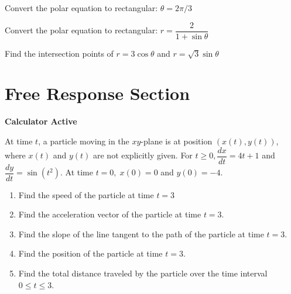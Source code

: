 \documentclass[11pt]{exam}
\begin{document}
\begin{questions}
\begin{minipage}{\linewidth}
\question Convert the polar equation to rectangular: $\theta = 2\pi/3$
 \answerline[$y = -\sqrt3 x$]


\end{minipage}

\begin{minipage}{\linewidth}


\question Convert the polar equation to rectangular: $r = \dfrac{2}{1 + \sin \theta}$
 \answerline[$x^2 + y^2 = (y-2)^2$]
\end{minipage}

\begin{minipage}{\linewidth}


\question Find the intersection points of $r = 3 \cos \theta$ and $r = \sqrt3 \sin \theta$


\answerline[ $\{ \pi/3, 4\pi/3 \}$]
\end{minipage}

\end{questions}

\clearpage
\section*{Free Response Section}
\noindent
\textbf{Calculator Active}
\vspace{2ex}

At time $t$, a particle moving in the $x y$-plane is at
position $(x(t), y(t))$, where $x(t)$ and $y(t)$ are
 not explicitly given. For
 $t \geq 0, \dfrac{d x}{d t}=4 t+1$ and
 $\dfrac{d y}{d t}=\sin \left(t^{2}\right)$.
  At time $t=0,\; x(0)=0$ and $y(0)=-4$.

\begin{enumerate}
\item Find the speed of the particle at time
$t=3$\\[1in]

\item Find the acceleration vector of the particle at time $t=3$.\\[1in]

\item Find the slope of the line tangent to
 the path of the particle at time $t=3$.\\[1in]

\item Find the position of the particle at
time $t=3$.\\[1.5in]

\item Find the total distance traveled by the
particle over the time interval $0 \leq t \leq 3$.
\end{enumerate}
\end{document}
